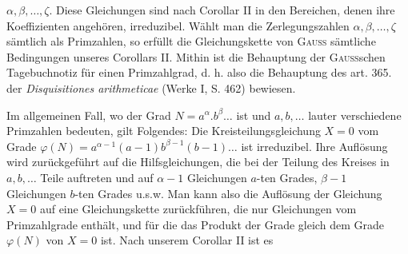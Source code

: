 \clearpage{}
\par\begingroup\small
\noindent\(\alpha,\beta,\ldots,\zeta\). Diese Gleichungen sind nach Corollar II in den Bereichen, denen ihre Koeffizienten angehören, irreduzibel. Wählt man die Zerlegungszahlen \(\alpha,\beta,\ldots,\zeta\) sämtlich als Primzahlen, so erfüllt die Gleichungskette von \textsc{Gauss} sämtliche Bedingungen unseres Corollars II. Mithin ist die Behauptung der \textsc{Gauss}schen Tagebuchnotiz für einen Primzahlgrad, d. h. also die Behauptung des art. 365. der \textit{Disquisitiones arithmeticae} (Werke I, S. 462) bewiesen.
\par\noindent\hspace*{\parindent}Im allgemeinen Fall, wo der Grad \(N=a^\alpha\mathord{.}b^\beta\ldots\) ist und \(a,b,\ldots\) lauter verschiedene Primzahlen bedeuten, gilt Folgendes: Die Kreisteilungsgleichung \(X=0\) vom Grade \(\varphi(N)=a^{\alpha-1}(a-1)b^{\beta-1}(b-1)\ldots\) ist irreduzibel. Ihre Auflösung wird zurückgeführt auf die Hilfsgleichungen, die bei der Teilung des Kreises in \(a,b,\ldots\) Teile auftreten und auf \(\alpha-1\) Gleichungen \(a\)-ten Grades, \(\beta-1\) Gleichungen \(b\)-ten Grades u.s.w. Man kann also die Auflösung der Gleichung \(X=0\) auf eine Gleichungskette zurückführen, die nur Gleichungen vom Primzahlgrade enthält, und für die das Produkt der Grade gleich dem Grade \(\varphi(N)\) von \(X=0\) ist. Nach unserem Corollar II ist es 
